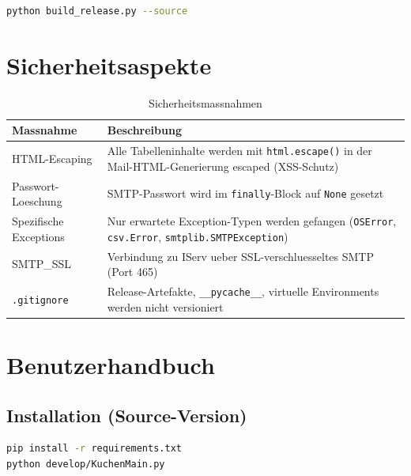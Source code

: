 \documentclass[12pt, a4paper]{article}
\begin{document}
\begin{codebox}
\begin{lstlisting}[language=bash, numbers=none]
python build_release.py --source
\end{lstlisting}
\end{codebox}


\section{Sicherheitsaspekte}

\begin{table}[ht!]
\centering
{}
\begin{tabularx}{\textwidth}{lX}
\toprule
\textbf{Massnahme} & \textbf{Beschreibung} \\
\midrule
HTML-Escaping & Alle Tabelleninhalte werden mit \texttt{html.escape()} in
    der Mail-HTML-Generierung escaped (XSS-Schutz) \\
Passwort-Loeschung & SMTP-Passwort wird im \texttt{finally}-Block auf
    \texttt{None} gesetzt \\
Spezifische Exceptions & Nur erwartete Exception-Typen werden gefangen
    (\texttt{OSError}, \texttt{csv.Error}, \texttt{smtplib.SMTPException}) \\
SMTP\_SSL & Verbindung zu IServ ueber SSL-verschluesseltes SMTP (Port 465) \\
\texttt{.gitignore} & Release-Artefakte, \texttt{\_\_pycache\_\_}, virtuelle
    Environments werden nicht versioniert \\
\bottomrule
\end{tabularx}
\caption{Sicherheitsmassnahmen}
\end{table}


\section{Benutzerhandbuch}

\subsection{Installation (Source-Version)}

\begin{codebox}[Schnellstart]
\begin{lstlisting}[language=bash, numbers=none]
pip install -r requirements.txt
python develop/KuchenMain.py
\end{lstlisting}
\end{codebox}
\end{document}
